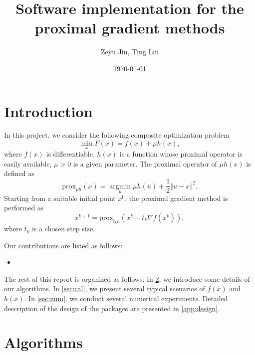 \documentclass[a4paper]{article}
\title{Software implementation for the proximal gradient methods}
\author{Zeyu Jin, Ting Lin}
\date{\today}
\newcommand{\norm}[1]{\left\Vert#1\right\Vert}
\newcommand{\prox}{\mathrm{prox}}
\begin{document}
  \maketitle
  \tableofcontents
  
  \section{Introduction}
  \label{sec:intro}
  In this project, we consider the following composite optimization 
  problem
  \begin{equation}
    \min\limits_{x} F(x) = f(x) + \mu h(x),
  \end{equation}
  where $f(x)$ is differentiable, $h(x)$ is a function whose 
  proximal operator is easily available, $\mu > 0$ is a given 
  parameter.
  The proximal operator of $\mu h(x)$ is defined as
  \begin{displaymath}
    \prox_{\mu h}(x) = \mathop{\arg\min}\limits_{u} \mu h(u) + 
    \frac{1}{2} \norm{u - x}^2.
  \end{displaymath}
  Starting from a suitable initial point $x^0$, the proximal gradient 
  method is performed as
  \begin{equation}\label{equ:pg}
    x^{k+1} = \prox_{t_k h} (x^k - t_k \nabla f(x^k)),
  \end{equation}
  where $t_k$ is a chosen step size.
  
  Our contributions are listed as follows:
  \begin{itemize}
    \item 
  \end{itemize}

  The rest of this report is organized as follows. In \cref{sec:alg}, 
  we introduce some details of our algorithms. In \cref{sec:cal}, we 
  present several typical scenarios of $f(x)$ and $h(x)$. In 
  \cref{sec:num}, we conduct several numerical experiments. Detailed 
  description of the design of the packages are presented in 
  \cref{app:design}.
  
  
  
  \section{Algorithms}
  \label{sec:alg}
  
\end{document}
